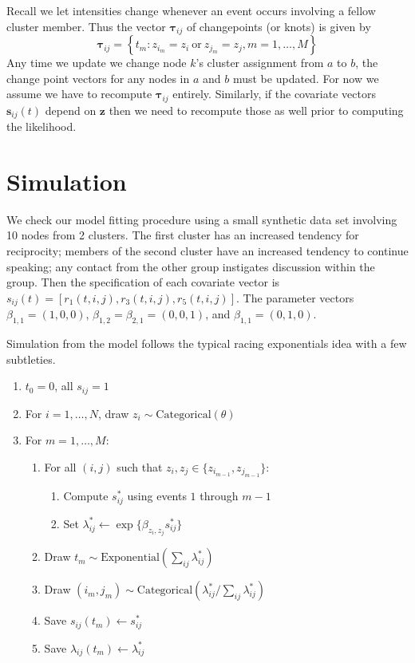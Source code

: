 \documentclass[11pt]{article}
\begin{document}
Recall we let intensities change whenever an event occurs involving a fellow cluster member.  Thus the vector $\boldsymbol{\tau}_{ij}$ of changepoints (or knots) is given by
$$\boldsymbol{\tau}_{ij} = \left\{ t_m: z_{i_m} = z_i \ \mbox{or} \ z_{j_m} = z_j, m=1,\ldots,M\right\}$$
Any time we update we change node $k$'s cluster assignment from $a$ to $b$, the change point vectors for any nodes in $a$ and $b$ must be updated.  For now we assume we have to recompute  $\boldsymbol{\tau}_{ij}$  entirely.  Similarly, if the covariate vectors $\mathbf{s}_{ij}(t)$ depend on $\mathbf{z}$ then we need to recompute those as well prior to computing the likelihood.%

\section{Simulation}

We check our model fitting procedure using a small synthetic data set involving 10 nodes from 2 clusters.  The first cluster has an increased tendency for reciprocity; members of the second cluster have an increased tendency to continue speaking; any contact from the other group instigates discussion within the group.  Then the specification of each covariate vector is $s_{ij}(t) = [r_1(t,i,j), r_3(t,i,j), r_5(t,i,j)]$.  The parameter vectors $\beta_{1,1} = (1,0,0)$,  $\beta_{1,2} = \beta_{2,1} = (0,0,1)$, and $\beta_{1,1} = (0,1,0)$.

Simulation from the model follows the typical racing exponentials idea with a few subtleties.

\begin{enumerate}
\item $t_0 = 0$, all $s_{ij} = 1$
\item For $i = 1, \ldots, N$, draw $z_i \sim \mbox{Categorical}(\theta)$
\item For $m = 1, \ldots, M$:
  \begin{enumerate}
  \item For all $(i,j)$ such that $z_i,z_j \in \{z_{i_{m-1}},z_{j_{m-1}}\}$:
    \begin{enumerate}
    \item Compute $s_{ij}^*$ using events $1$ through $m-1$
    \item Set $\lambda_{ij}^* \leftarrow \exp\{ \beta_{z_i,z_j} s_{ij}^*\}$ 
    \end{enumerate}
  \item Draw $t_m \sim \mbox{Exponential}\left(\sum_{ij} \lambda_{ij}^*\right)$
  \item Draw $(i_m,j_m) \sim \mbox{Categorical}\left(\lambda_{ij}^* / \sum_{ij}\lambda_{ij}^*\right)$
  \item Save $s_{ij}(t_m) \leftarrow s_{ij}^*$
  \item Save $\lambda_{ij}(t_m) \leftarrow \lambda_{ij}^*$
  \end{enumerate}
\end{enumerate}
\end{document}

